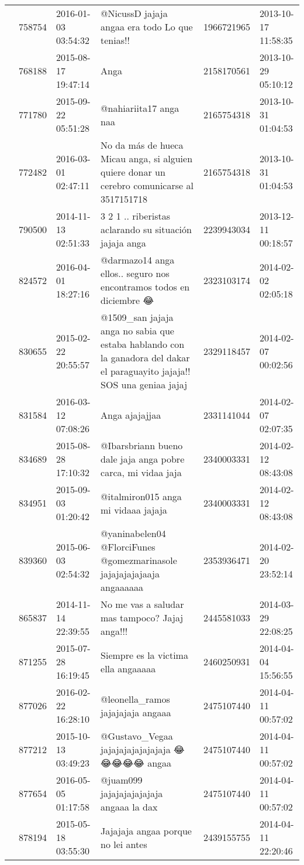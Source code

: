 \begin{tabular}{llllrl}
 & 758754& 2016-01-03 03:54:32 & @NicussD jajaja angaa era todo Lo que tenias!! &1966721965 & 2013-10-17 11:58:35 \\
 & 768188& 2015-08-17 19:47:14 & Anga &2158170561 & 2013-10-29 05:10:12 \\
 & 771780& 2015-09-22 05:51:28 & @nahiariita17 anga naa &2165754318 & 2013-10-31 01:04:53 \\
 & 772482& 2016-03-01 02:47:11 &No da más de hueca Micau anga, si alguien quiere donar un cerebro comunicarse al 3517151718 &2165754318 & 2013-10-31 01:04:53 \\
 & 790500& 2014-11-13 02:51:33 & 3 2 1 .. riberistas aclarando su situación jajaja anga &2239943034 & 2013-12-11 00:18:57 \\
 & 824572& 2016-04-01 18:27:16 &@darmazo14 anga ellos.. seguro nos encontramos todos en diciembre 😂 &2323103174 & 2014-02-02 02:05:18 \\
 & 830655& 2015-02-22 20:55:57 &@1509\_san jajaja anga no sabia que estaba hablando con la ganadora del dakar el paraguayito jajaja!! SOS una geniaa jajaj &2329118457 & 2014-02-07 00:02:56 \\
 & 831584& 2016-03-12 07:08:26 & Anga ajajajjaa &2331141044 & 2014-02-07 02:07:35 \\
 & 834689& 2015-08-28 17:10:32 & @Ibarsbriann bueno dale jaja anga pobre carca, mi vidaa jaja &2340003331 & 2014-02-12 08:43:08 \\
 & 834951& 2015-09-03 01:20:42 &@italmiron015 anga mi vidaaa jajaja &2340003331 & 2014-02-12 08:43:08 \\
 & 839360& 2015-06-03 02:54:32 & @yaninabelen04 @FlorciFunes @gomezmarinasole jajajajajajaaja angaaaaaa &2353936471 & 2014-02-20 23:52:14 \\
 & 865837& 2014-11-14 22:39:55 & No me vas a saludar mas tampoco? Jajaj anga!!! &2445581033 & 2014-03-29 22:08:25 \\
 & 871255& 2015-07-28 16:19:45 &Siempre es la victima ella angaaaaa &2460250931 & 2014-04-04 15:56:55 \\
 & 877026& 2016-02-22 16:28:10 &@leonella\_ramos jajajajaja angaaa &2475107440 & 2014-04-11 00:57:02 \\
 & 877212& 2015-10-13 03:49:23 &@Gustavo\_Vegaa jajajajajajajajaja 😂😂😂😂😂 angaa &2475107440 & 2014-04-11 00:57:02 \\
 & 877654& 2016-05-05 01:17:58 &@juam099 jajajajajajajaja angaaa la dax &2475107440 & 2014-04-11 00:57:02 \\
 & 878194& 2015-05-18 03:55:30 & Jajajaja angaa porque no lei antes &2439155755 & 2014-04-11 22:20:46 \\

\end{tabular}
